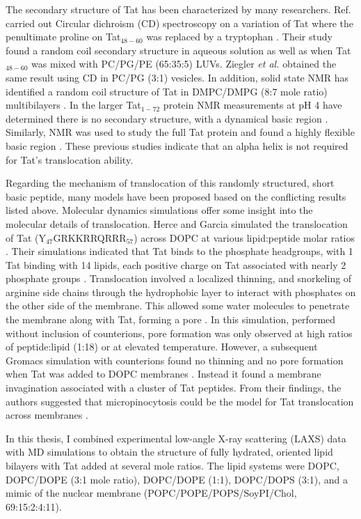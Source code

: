 The secondary structure of Tat has been characterized by many researchers. 
Ref.\cite{Thoren04} carried out Circular dichroism (CD) spectroscopy on a 
variation of Tat where the penultimate proline on Tat$_{48-60}$ was replaced by a
tryptophan \cite{Thoren04}. Their study found a random coil secondary structure 
in aqueous solution as well as when Tat$_{48-60}$ was mixed with PC/PG/PE (65:35:5) LUVs. 
Ziegler \textit{et al.} \cite{Ziegler05} obtained the same result using CD in 
PC/PG (3:1) vesicles. In addition, solid state NMR has identified a random coil 
structure of Tat in DMPC/DMPG (8:7 mole ratio) multibilayers \cite{Su10}. 
In the larger Tat$_{1-72}$ protein NMR measurements at pH 4 have determined there 
is no secondary structure, with a dynamical basic region \cite{Shojania06}. 
Similarly, NMR was used to study the full Tat protein and found a highly 
flexible basic region \cite{Bayer95}. These previous studies indicate that 
an alpha helix is not required for Tat’s translocation ability. 

Regarding the mechanism of translocation of this randomly structured, short 
basic peptide, many models have been proposed based on the conflicting results 
listed above. Molecular dynamics simulations offer some insight into the 
molecular details of translocation. Herce and Garcia simulated the 
translocation of Tat (Y$_{47}$GRKKRRQRRR$_{57}$) across DOPC at various 
lipid:peptide molar ratios \cite{Herce07}. Their simulations indicated that Tat 
binds to the phosphate headgroups, with 1 Tat binding with 14 lipids, each 
positive charge on Tat associated with nearly 2 phosphate groups \cite{Herce07}. 
Translocation involved a localized thinning, and snorkeling of arginine side 
chains through the hydrophobic layer to interact with phosphates on
the other side of the membrane. This allowed some water molecules to penetrate 
the membrane along with Tat, forming a pore \cite{Herce07}. In this simulation, 
performed without inclusion of counterions, pore formation was only observed at 
high ratios of peptide:lipid (1:18) or at elevated temperature. However, a 
subsequent Gromacs simulation with counterions found no thinning and no pore 
formation when Tat was added to DOPC membranes \cite{Yesylevskyy09}. Instead it 
found a membrane invagination associated with a cluster of Tat peptides. From 
their findings, the authors suggested that micropinocytosis could be the model 
for Tat translocation across membranes \cite{Yesylevskyy09}. 

In this thesis, I combined experimental low-angle X-ray scattering (LAXS) 
data with MD simulations to obtain the structure of fully hydrated, oriented 
lipid bilayers with Tat added at several mole ratios. The lipid systems 
were DOPC, DOPC/DOPE (3:1 mole ratio), DOPC/DOPE (1:1), DOPC/DOPS (3:1), and a 
mimic of the nuclear membrane (POPC/POPE/POPS/SoyPI/Chol, 69:15:2:4:11). 

